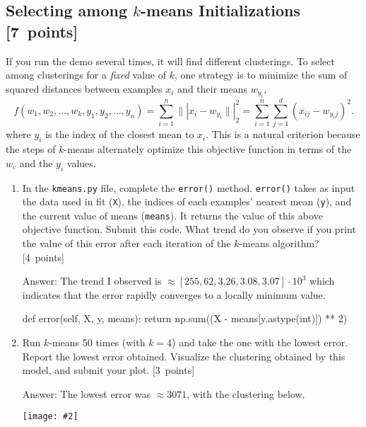 \documentclass{article}
\newcommand{\blu}[1]{{\textcolor{blu}{#1}}}
\newenvironment{answer}{\par\begingroup\color{gre}Answer: }{\endgroup}
\let\ask\blu
\newcommand\pts[1]{\textcolor{pointscolour}{[#1~points]}}
\newcommand{\norm}[1]{\lVert| #1 \rVert|}
\newcommand{\centerfig}[2]{\begin{center}\texttt{[image: \#2]}\end{center}}
\begin{document}
    \subsection{Selecting among $k$-means Initializations \pts{7}}

    If you run the demo several times, it will find different clusterings. To select among clusterings for a \emph{fixed} value of $k$, one strategy is to minimize the sum of squared distances between examples $x_i$ and their means $w_{y_i}$,
    \[
    f(w_1,w_2,\dots,w_k,y_1,y_2,\dots,y_n) = \sum_{i=1}^n \norm{x_i - w_{y_i}}_2^2 = \sum_{i=1}^n \sum_{j=1}^d (x_{ij} - w_{y_ij})^2.
    \]
    where $y_i$ is the index of the closest mean to $x_i$. This is a natural criterion because the steps of $k$-means alternately optimize this objective function in terms of the $w_c$ and the $y_i$ values.

    \begin{enumerate}
        \item In the \texttt{kmeans.py} file, complete the \texttt{error()} method. \texttt{error()} takes as input the data used in fit (\texttt{X}), the indices of each examples' nearest mean (\texttt{y}), and the current value of means (\texttt{means}). It returns the value of this above objective function. \ask{Submit this code. What trend do you observe if you print the value of this error after each iteration of the $k$-means algorithm?} \pts{4}
        \begin{answer}
            The trend I observed is $\approx [255, 62, 3.26, 3.08, 3.07] \cdot 10^3$ which indicates that the error rapidly converges to a locally minimum value.
        \end{answer}
        \begin{python}
def error(self, X, y, means):
    return np.sum((X - means[y.astype(int)]) ** 2)
        \end{python}

        \item Run $k$-means 50 times (with $k=4$) and take the one with the lowest error. \ask{Report the lowest error obtained.} Visualize the clustering obtained by this model, and \ask{submit your plot}. \pts{3}
        \begin{answer}
            The lowest error was $\approx 3071$, with the clustering below.
            \centerfig{0.6}{figs/kmeans_best}
        \end{answer}
    \end{enumerate}
\end{document}
